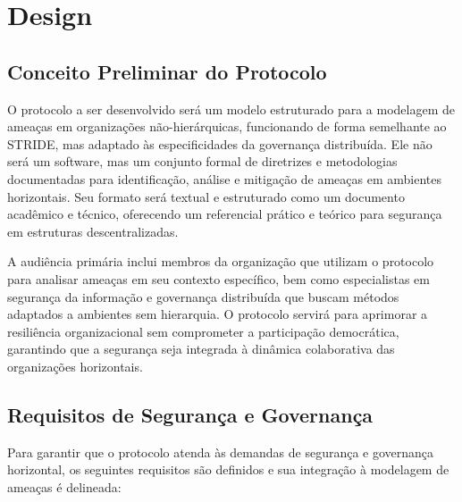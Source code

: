 
%

\chapter{Design}
\label{cha:design}

\glsresetall
 
\section{Conceito Preliminar do Protocolo}
\label{sec:preliminary_protocol_concept}

O protocolo a ser desenvolvido será um modelo estruturado para a modelagem de
ameaças em organizações não-hierárquicas, funcionando de forma semelhante ao
STRIDE, mas adaptado às especificidades da governança distribuída. Ele não será
um software, mas um conjunto formal de diretrizes e metodologias documentadas
para identificação, análise e mitigação de ameaças em ambientes horizontais. Seu
formato será textual e estruturado como um documento acadêmico e técnico,
oferecendo um referencial prático e teórico para segurança em estruturas
descentralizadas.

A audiência primária inclui membros da organização que utilizam o protocolo para
analisar ameaças em seu contexto específico, bem como especialistas em segurança
da informação e governança distribuída que buscam métodos adaptados a ambientes
sem hierarquia. O protocolo servirá para aprimorar a resiliência organizacional
sem comprometer a participação democrática, garantindo que a segurança seja
integrada à dinâmica colaborativa das organizações horizontais.

\section{Requisitos de Segurança e Governança}
\label{sec:security_governance_requirements}

Para garantir que o protocolo atenda às demandas de segurança e governança
horizontal, os seguintes requisitos são definidos e sua integração à modelagem
de ameaças é delineada:
    
